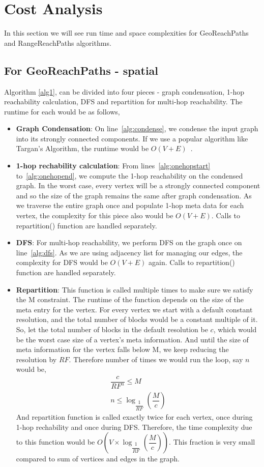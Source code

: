 \section{Cost Analysis}

In this section we will see run time and space complexities for GeoReachPaths and RangeReachPaths algorithms.

\subsection{For GeoReachPaths - spatial}
Algorithm \ref{alg1}, can be divided into four pieces - graph condensation, 1-hop reachability calculation, DFS and repartition for multi-hop reachability. The runtime for each would be as follows,
\begin{itemize}
  \item \textbf{Graph Condensation}: On line~\ref{alg:condense}, we condense the input graph into its strongly connected components. If we use a popular algorithm like Targan's Algorithm, the runtime would be $O(V + E)$~\cite{R1972}.

  \item \textbf{1-hop rechability calculation}: From lines~\ref{alg:onehopstart} to~\ref{alg:onehopend}, we compute the 1-hop reachability on the condensed graph. In the worst case, every vertex will be a strongly connected component and so the size of the graph remains the same after graph condensation. As we traverse the entire graph once and populate 1-hop meta data for each vertex, the complexity for this piece also would be $O(V + E)$. Calls to repartition() function are handled separately.

  \item \textbf{DFS}: For multi-hop reachability, we perform DFS on the graph once on line~\ref{alg:dfs}. As we are using adjacency list for managing our edges, the complexity for DFS would be $O(V + E)$ again. Calls to repartition() function are handled separately.

  \item \textbf{Repartition}: This function is called multiple times to make sure we satisfy the M constraint. The runtime of the function depends on the size of the meta entry for the vertex. For every vertex we start with a default constant resolution, and the total number of blocks would be a constant multiple of it. So, let the total number of blocks in the default resolution be $c$, which would be the worst case size of a vertex's meta information. And until the size of meta information for the vertex falls below M, we keep reducing the resolution by $RF$. Therefore number of times we would run the loop, say $n$ would be,
  \begin{eqnarray*}
  	\dfrac{c}{RF^n} \leq M\\
  	n \leq {\log_{\dfrac{1}{RF}} (\dfrac{M}{c})}
  \end{eqnarray*}
  And repartition function is called exactly twice for each vertex, once during 1-hop rechability and once during DFS. Therefore, the time complexity due to this function would be $O(V \times {\log_{\dfrac{1}{RF}} (\dfrac{M}{c})})$. This fraction is very small compared to sum of vertices and edges in the graph.
\end{itemize}

